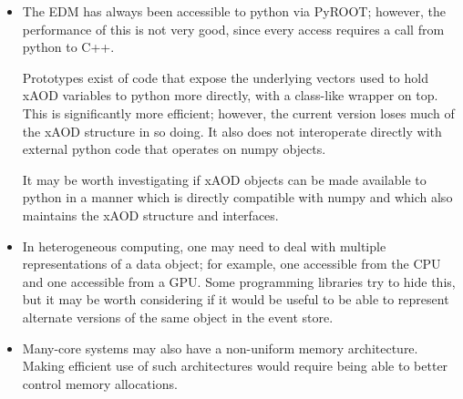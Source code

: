 \begin{itemize}
\item The EDM has always been accessible to python via PyROOT;
  however, the performance
  of this is not very good, since every access requires a call from
  python to C++.

  Prototypes exist of code that expose the underlying vectors used
  to hold xAOD variables to python more directly, with a class-like
  wrapper on top.  This is significantly more efficient;
  however, the current version loses much of the xAOD structure in so doing.
  It also does not interoperate directly with external python code
  that operates on numpy objects.

  It may be worth investigating if xAOD objects can be made available to python
  in a manner which is directly compatible with numpy and which also
  maintains the xAOD structure and interfaces.

\item In heterogeneous computing, one may need to deal with multiple
  representations of a data object; for example, one accessible from
  the CPU and one accessible from a GPU.  Some programming libraries
  try to hide this, but it may be worth considering if it would
  be useful to be able to represent alternate versions of the same
  object in the event store.

\item Many-core systems may also have a non-uniform memory architecture.
  Making efficient use of such architectures would require being able
  to better control memory allocations.
\end{itemize}
